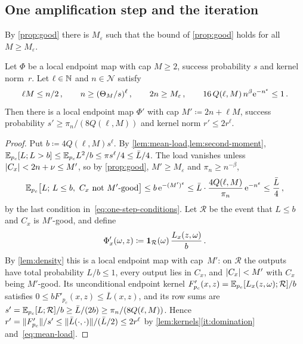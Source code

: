 \subsection{One amplification step and the iteration}\label{sec:iteration}

By \cref{prop:good} there is $M_\varepsilon$ such that the bound of \cref{prop:good} holds for all
$M\ge M_\varepsilon$.

\begin{lemma}\label{lem:one-step}
Let $\Phi$ be a local endpoint map with cap $M\ge2$, success probability $s$ and kernel norm~$r$. Let
$\ell\in\mathbb N$ and $n\in\mathcal N$ satisfy
\begin{equation}\label{eq:one-step-conditions}
  \ell M\le n/2\,,\qquad n\ge(\Theta_M/s)^\ell\,,\qquad 2n\ge M_\varepsilon\,,\qquad
  16\,Q(\ell,M)\,n^\beta\mathrm{e}^{-n^\varepsilon}\le1\,.
\end{equation}
Then there is a local endpoint map $\Phi'$ with cap $M'\coloneqq2n+\ell M$, success probability
$s'\ge\pi_n/(8Q(\ell,M))$ and kernel norm $r'\le2r^\ell$.
\end{lemma}

\begin{proof}
Put $b\coloneqq4Q(\ell,M)s^\ell$. By \cref{lem:mean-load,lem:second-moment},
$\mathbb E_{p_c}[L;L>b]\le\mathbb E_{p_c}L^2/b\le\pi s^\ell/4\le\bar L/4$. The load vanishes unless
$\lvert C_x\rvert<2n+\nu\le M'$, so by \cref{prop:good}, $M'\ge M_\varepsilon$ and $\pi_n\ge n^{-\beta}$,
\begin{equation*}
  \mathbb E_{p_c}\bigl[L;\,L\le b,\ C_x\text{ not $M'$-good}\bigr]\le b\,\mathrm{e}^{-(M')^\varepsilon}
  \le\bar L\cdot\frac{4Q(\ell,M)}{\pi_n}\,\mathrm{e}^{-n^\varepsilon}\le\frac{\bar L}4\,,
\end{equation*}
by the last condition in~\eqref{eq:one-step-conditions}. Let $\mathcal R$ be the event that $L\le b$
and $C_x$ is $M'$-good, and define
\begin{equation*}
  \Phi'_x(\omega,z)\coloneqq\mathbf{1}_{\mathcal R}(\omega)\,\frac{L_x(z,\omega)}{b}\,.
\end{equation*}
By \cref{lem:density} this is a local endpoint map with cap~$M'$: on $\mathcal R$ the outputs have total
probability $L/b\le1$, every output lies in $C_x$, and $\lvert C_x\rvert<M'$ with $C_x$ being $M'$-good. Its
unconditional endpoint kernel $F'_{p_c}(x,z)=\mathbb E_{p_c}[L_x(z,\omega);\mathcal R]/b$ satisfies
$0\le bF'_{p_c}(x,z)\le\bar L(x,z)$, and its row sums are $s'=\mathbb E_{p_c}[L;\mathcal R]/b\ge\bar L/(2b)\ge\pi_n/(8Q(\ell,M))$. Hence
$r'=\lVert F'_{p_c}\rVert/s'\le\lVert\bar L(\cdot,\cdot)\rVert/(\bar L/2)\le2r^\ell$ by \cref{lem:kernels}\ref{it:domination}
and~\eqref{eq:mean-load}.
\end{proof}

